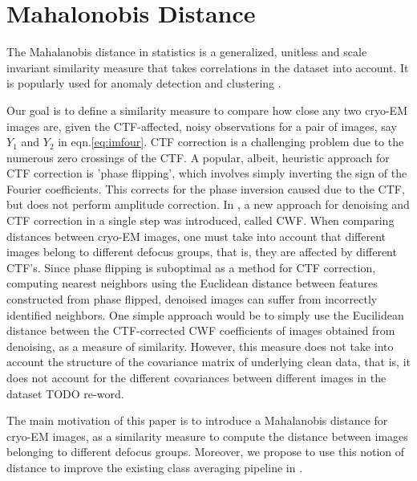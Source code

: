 \documentclass{article}
\begin{document}
\section{Mahalonobis Distance}
The Mahalanobis distance in statistics \cite{mah} is a generalized, unitless and scale invariant similarity measure that takes correlations in the dataset into account. It is popularly used for anomaly detection and clustering \cite{mahclust1, mahclust2}.
 
Our goal is to define a similarity measure to compare how close any two cryo-EM images are, given the CTF-affected, noisy observations for a pair of images, say $Y_1$ and $Y_2$ in eqn.\ref{eq:imfour}.
CTF correction is a challenging problem due to the numerous zero crossings of the CTF. A popular, albeit, heuristic approach for CTF correction is 'phase flipping', which involves simply inverting the sign of the Fourier coefficients. This corrects for the phase inversion caused due to the CTF, but does not perform amplitude correction. In \cite{cwf}, a new approach for denoising and CTF correction in a single step was introduced, called CWF. When comparing distances between cryo-EM images, one must take into account that different images belong to different defocus groups, that is, they are affected by different CTF's. Since phase flipping is suboptimal as a method for CTF correction, computing nearest neighbors using the Euclidean distance between features constructed from phase flipped, denoised images can suffer from incorrectly identified neighbors. One simple approach would be to simply use the Eucilidean distance between the CTF-corrected CWF coefficients of images obtained from denoising, as a measure of similarity. However, this measure does not take into account the structure of the covariance matrix of underlying clean data, that is, it does not account for the different covariances between different images in the dataset {\color{red} TODO re-word}.

The main motivation of this paper is to introduce a Mahalanobis distance for cryo-EM images, as a similarity measure to compute the distance between images belonging to different defocus groups. Moreover, we propose to use this notion of distance to improve the existing class averaging pipeline in \cite{zhao}.
\end{document}
